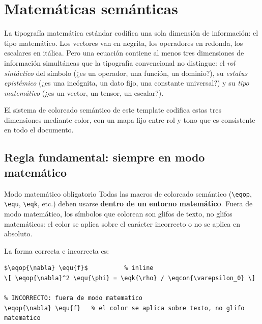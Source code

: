 \chapter{Matemáticas semánticas}
\label{ch:ecuaciones}

La tipografía matemática estándar codifica una sola dimensión de información:
el tipo matemático. Los vectores van en negrita, los operadores en redonda,
los escalares en itálica. Pero una ecuación contiene al menos tres dimensiones
de información simultáneas que la tipografía convencional no distingue: el
\textit{rol sintáctico} del símbolo (¿es un operador, una función, un dominio?),
su \textit{estatus epistémico} (¿es una incógnita, un dato fijo, una constante
universal?) y su \textit{tipo matemático} (¿es un vector, un tensor, un escalar?).

El sistema de coloreado semántico de este template codifica estas tres
dimensiones mediante color, con un mapa fijo entre rol y tono que es
consistente en todo el documento.

\section{Regla fundamental: siempre en modo matemático}
\label{sec:regla-matmode}

\begin{definicion}{Modo matemático obligatorio}
\label{def:matmode}
Todas las macros de coloreado semántico (\texttt{\textbackslash eqop},
\texttt{\textbackslash equ}, \texttt{\textbackslash eqk}, etc.) deben usarse
\textbf{dentro de un entorno matemático}. Fuera de modo matemático, los
símbolos que colorean son glifos de texto, no glifos matemáticos: el color
se aplica sobre el carácter incorrecto o no se aplica en absoluto.
\end{definicion}

La forma correcta e incorrecta es:

\begin{lstlisting}[style=latex, frame=none, numbers=none]
% CORRECTO: dentro de modo matematico
$\eqop{\nabla} \equ{f}$          % inline
\[ \eqop{\nabla}^2 \equ{\phi} = \eqk{\rho} / \eqcon{\varepsilon_0} \]

% INCORRECTO: fuera de modo matematico
\eqop{\nabla} \equ{f}   % el color se aplica sobre texto, no glifo matematico
\end{lstlisting}

